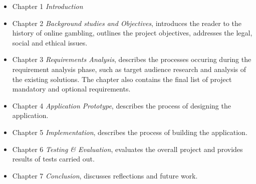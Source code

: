 \begin{itemize}
	\item Chapter 1 \emph{Introduction}
	\item Chapter 2 \emph{Background studies and Objectives}, introduces the reader to the history of online gambling, outlines the project objectives, addresses the legal, social and ethical issues.
	\item Chapter 3 \emph{Requirements Analysis}, describes the processes occuring during the requirement analysis phase, such as target audience research and analysis of the existing solutions. The chapter also contains the final list of project mandatory and optional requirements.
	\item Chapter 4 \emph{Application Prototype}, describes the process of designing the application.
	\item Chapter 5 \emph{Implementation}, describes the process of building the application.
	\item Chapter 6 \emph{Testing \& Evaluation}, evaluates the overall project and provides results of tests carried out.
	\item Chapter 7 \emph{Conclusion}, discusses reflections and future work.
\end{itemize} 
